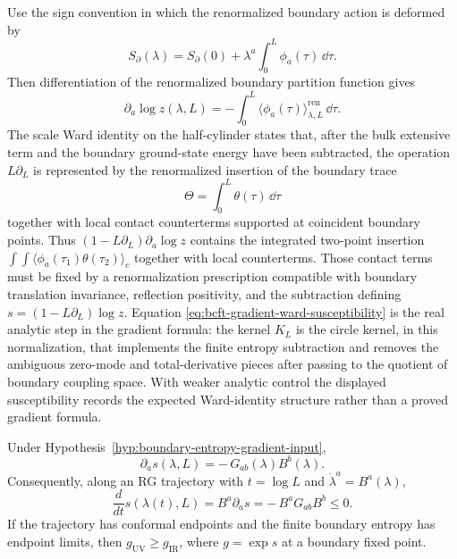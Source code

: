 Use the sign convention in which the renormalized boundary action is deformed
by
\[
  S_{\partial}(\lambda)
  =
  S_{\partial}(0)+\lambda^a\int_0^L\phi_a(\tau)\,\dd\tau .
\]
Then differentiation of the renormalized boundary partition function gives
\begin{equation}
  \partial_a\log z(\lambda,L)
  =
  -\int_0^L
  \bigl\langle\phi_a(\tau)\bigr\rangle_{\lambda,L}^{\mathrm{ren}}\,
  \dd\tau .
  \label{eq:bcft-boundary-coupling-derivative}
\end{equation}
The scale Ward identity on the half-cylinder states that, after the bulk
extensive term and the boundary ground-state energy have been subtracted, the
operation \(L\partial_L\) is represented by the renormalized insertion of the
boundary trace
\[
  \Theta=\int_0^L\theta(\tau)\,\dd\tau
\]
together with local contact counterterms supported at coincident boundary
points.  Thus \((1-L\partial_L)\partial_a\log z\) contains the integrated
two-point insertion
\(\int\!\int\langle\phi_a(\tau_1)\theta(\tau_2)\rangle_c\) together with local
counterterms.  Those contact terms must be fixed by a renormalization
prescription compatible with boundary translation invariance, reflection
positivity, and the subtraction defining \(s=(1-L\partial_L)\log z\).  Equation
\eqref{eq:bcft-gradient-ward-susceptibility} is the real analytic step in the
gradient formula: the kernel \(K_L\) is the circle kernel, in this
normalization, that implements the finite entropy subtraction and removes the
ambiguous zero-mode and total-derivative pieces after passing to the quotient
of boundary coupling space.  With weaker analytic control the displayed
susceptibility records the expected Ward-identity structure rather than a
proved gradient formula.

\begin{proposition}
\label{prop:boundary-entropy-monotonicity-from-gradient-input}
Under Hypothesis~\ref{hyp:boundary-entropy-gradient-input},
\begin{equation}
  \partial_a s(\lambda,L)
  =
  -\,G_{ab}(\lambda)B^b(\lambda).
  \label{eq:boundary-gradient-formula}
\end{equation}
Consequently, along an RG trajectory with \(t=\log L\) and
\(\dot\lambda^a=B^a(\lambda)\),
\begin{equation}
  \frac{d}{dt}s(\lambda(t),L)
  =
  B^a\partial_a s
  =
  -\,B^aG_{ab}B^b
  \leq0 .
  \label{eq:boundary-g-monotonicity-from-gradient}
\end{equation}
If the trajectory has conformal endpoints and the finite boundary entropy has
endpoint limits, then \(g_{\mathrm{UV}}\ge g_{\mathrm{IR}}\), where
\(g=\exp s\) at a boundary fixed point.
\end{proposition}

